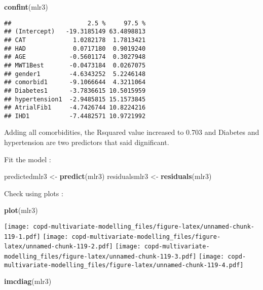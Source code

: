 \documentclass[
]{article}
\newenvironment{Shaded}{\begin{snugshade}}{\end{snugshade}}
\newcommand{\FunctionTok}[1]{\textcolor[rgb]{0.13,0.29,0.53}{\textbf{#1}}}
\newcommand{\NormalTok}[1]{#1}
\newcommand{\OtherTok}[1]{\textcolor[rgb]{0.56,0.35,0.01}{#1}}
\begin{document}
\begin{Shaded}
\begin{Highlighting}[]
\FunctionTok{confint}\NormalTok{(mlr3)}
\end{Highlighting}
\end{Shaded}

\begin{verbatim}
##                     2.5 %     97.5 %
## (Intercept)   -19.3185149 63.4898813
## CAT             1.0282178  1.7813421
## HAD             0.0717180  0.9019240
## AGE            -0.5601174  0.3027948
## MWT1Best       -0.0473184  0.0267075
## gender1        -4.6343252  5.2246148
## comorbid1      -9.1066644  4.3211064
## Diabetes1      -3.7836615 10.5015959
## hypertension1  -2.9485815 15.1573845
## AtrialFib1     -4.7426744 10.8224216
## IHD1           -7.4482571 10.9721992
\end{verbatim}

Adding all comorbidities, the Rsquared value increased to 0.703 and
Diabetes and hypertension are two predictors that said dignificant.

Fit the model :

\begin{Shaded}
\begin{Highlighting}[]
\NormalTok{predictedmlr3 }\OtherTok{\textless{}{-}} \FunctionTok{predict}\NormalTok{(mlr3)}
\NormalTok{residualsmlr3 }\OtherTok{\textless{}{-}} \FunctionTok{residuals}\NormalTok{(mlr3)}
\end{Highlighting}
\end{Shaded}

Check using plots :

\begin{Shaded}
\begin{Highlighting}[]
\FunctionTok{plot}\NormalTok{(mlr3)}
\end{Highlighting}
\end{Shaded}

\texttt{[image: copd-multivariate-modelling\_files/figure-latex/unnamed-chunk-119-1.pdf]}
\texttt{[image: copd-multivariate-modelling\_files/figure-latex/unnamed-chunk-119-2.pdf]}
\texttt{[image: copd-multivariate-modelling\_files/figure-latex/unnamed-chunk-119-3.pdf]}
\texttt{[image: copd-multivariate-modelling\_files/figure-latex/unnamed-chunk-119-4.pdf]}

\begin{Shaded}
\begin{Highlighting}[]
\FunctionTok{imcdiag}\NormalTok{(mlr3)}
\end{Highlighting}
\end{Shaded}
\end{document}
